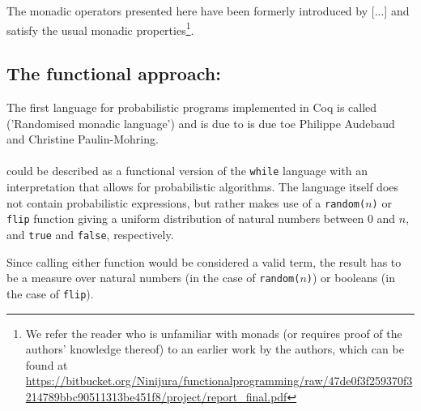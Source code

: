 \documentclass[11pt, leqno, titlepage]{article}
\theoremstyle{definition}
\begin{document}

The monadic operators presented here have been formerly introduced by
[...] %
and satisfy the usual monadic  properties\footnote{We
  refer the reader who is unfamiliar with monads (or requires proof of the authors'
  knowledge thereof) to an earlier work by the authors, which can be found at
  \url{https://bitbucket.org/Ninijura/functionalprogramming/raw/47de0f3f259370f3214789bbc90511313be451f8/project/report_final.pdf}}. 



\subsection{The functional approach: \rml}\label{sec:rml}
The first language for probabilistic programs implemented in Coq is called \rml
('Randomised monadic language')
and is due to is due toe Philippe Audebaud and Christine Paulin-Mohring. %
\\ \\
\rml could be described as a functional version of the \texttt{while} language with
an interpretation that allows for probabilistic algorithms. The language itself does
not contain probabilistic expressions, but rather makes use of a \texttt{random($n$)}
or \texttt{flip} function giving a uniform distribution of natural numbers between 0
and $n$, and \texttt{true} and \texttt{false}, respectively.

Since calling either function would be considered a valid \rml term, the result has
to be a measure over natural numbers (in the case of \texttt{random($n$)}) or
booleans (in the case of \texttt{flip}).
\end{document}
